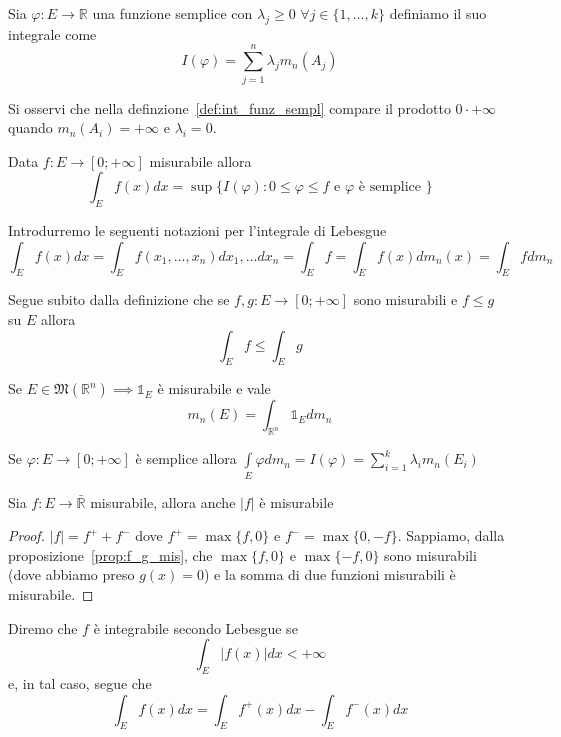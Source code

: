 \begin{definition}
	Sia $\varphi: E \to \mathbb{R}$ una funzione semplice con $\lambda_j \geq 0 \, \, \forall j \in \{1, \ldots, k \}$ definiamo il suo integrale come
	\begin{equation}
		I(\varphi) = \sum_{j=1}^n \lambda_j m_n(A_j)
		\label{def:int_funz_sempl}
	\end{equation}
\end{definition}
\begin{remark}
Si osservi che nella definzione~\ref{def:int_funz_sempl} compare il prodotto $0 \cdot +\infty$ quando $m_n(A_i) = +\infty$ e $\lambda_i = 0$.
\end{remark}
\begin{definition}
	Data $f: E \to [0; +\infty]$ misurabile allora
	$$
		\int_E f(x)dx = \sup\{I(\varphi) : 0 \leq \varphi \leq f \text{ e } \varphi \text{ è semplice } \}
	$$
\end{definition}
Introdurremo le seguenti notazioni per l'integrale di Lebesgue
$$
\int_E f(x)dx = \int_E f(x_1, \ldots, x_n)dx_1, \ldots dx_n = \int_E f = \int_E f(x)dm_n(x) = \int_E fdm_n 
$$
\begin{remark}
Segue subito dalla definizione che se $f, g: E \to [0; +\infty]$ sono misurabili e $f \leq g$ su $E$ allora
$$
\int_E f \leq \int_E g
$$
\end{remark}
\begin{remark}
Se $E \in \mathfrak{M}(\mathbb{R}^n) \implies \mathbb{1}_E$ è misurabile e vale
$$
m_n(E) = \int_{\mathbb{R}^n} \mathbb{1}_E dm_n
$$
\end{remark}
\begin{remark}
Se $\varphi: E \to [0; +\infty]$ è semplice allora $\int\limits_E \varphi dm_n = I(\varphi) = \sum\limits_{i=1}^k \lambda_i m_n(E_i) $
\end{remark}
\begin{prop}
Sia $f: E \to \bar{\mathbb{R}}$ misurabile, allora anche $|f|$ è misurabile
\end{prop}
\begin{proof}
$|f| = f^+ + f^-$ dove $f^{+} = \max\{f, 0 \}$ e $f^{-}=\max\{0, -f \}$. Sappiamo, dalla proposizione~\ref{prop:f_g_mis}, che $\max\{f,0 \}$ e $\max\{-f, 0\}$ sono misurabili (dove abbiamo preso $g(x) = 0$) e la somma di due funzioni misurabili è misurabile.
\end{proof}
\begin{definition}
	Diremo che $f$ è integrabile secondo Lebesgue se
	$$
	\int_E |f(x)|dx < +\infty
	$$
	e, in tal caso, segue che
	$$
	\int_E f(x)dx = \int_E f^{+}(x)dx - \int_E f^{-}(x)dx
	$$
\end{definition}
